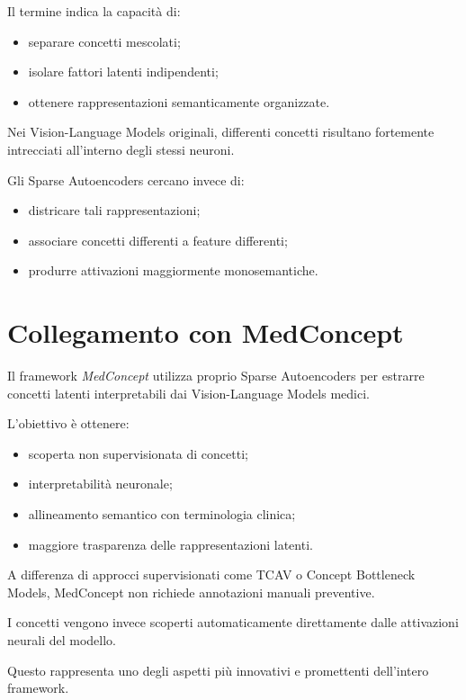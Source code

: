 Il termine indica la capacità di:

\begin{itemize}
    \item separare concetti mescolati;
    \item isolare fattori latenti indipendenti;
    \item ottenere rappresentazioni semanticamente organizzate.
\end{itemize}

Nei Vision-Language Models originali, differenti concetti risultano fortemente intrecciati all'interno degli stessi neuroni.

Gli Sparse Autoencoders cercano invece di:

\begin{itemize}
    \item districare tali rappresentazioni;
    \item associare concetti differenti a feature differenti;
    \item produrre attivazioni maggiormente monosemantiche.
\end{itemize}

\section{Collegamento con MedConcept}

Il framework \textit{MedConcept} utilizza proprio Sparse Autoencoders per estrarre concetti latenti interpretabili dai Vision-Language Models medici.

L'obiettivo è ottenere:

\begin{itemize}
    \item scoperta non supervisionata di concetti;
    \item interpretabilità neuronale;
    \item allineamento semantico con terminologia clinica;
    \item maggiore trasparenza delle rappresentazioni latenti.
\end{itemize}

A differenza di approcci supervisionati come TCAV o Concept Bottleneck Models, MedConcept non richiede annotazioni manuali preventive.

I concetti vengono invece scoperti automaticamente direttamente dalle attivazioni neurali del modello.

Questo rappresenta uno degli aspetti più innovativi e promettenti dell'intero framework.